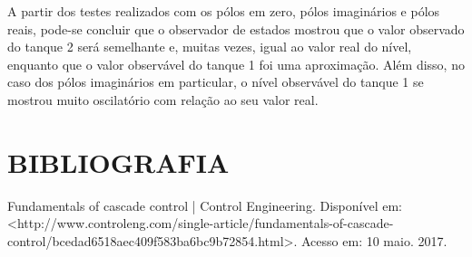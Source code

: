 \documentclass[a4paper,12pt]{article}
\begin{document}
\hspace{4ex}A partir dos testes realizados com os pólos em zero, pólos imaginários e pólos reais, pode-se concluir que o observador de estados mostrou que o valor observado do tanque 2 será semelhante e, muitas vezes, igual ao valor real do nível, enquanto que o valor observável do tanque 1 foi uma aproximação. Além disso, no caso dos pólos imaginários em particular, o nível observável do tanque 1 se mostrou muito oscilatório com relação ao seu valor real.

\newpage

\thispagestyle{empty}
\section{BIBLIOGRAFIA}

Fundamentals of cascade control | Control Engineering. Disponível em: <http://www.controleng.com/single-article/fundamentals-of-cascade-control/bcedad6518aec409f583ba6bc9b72854.html>. Acesso em: 10 maio. 2017.





%


%
\end{document}
